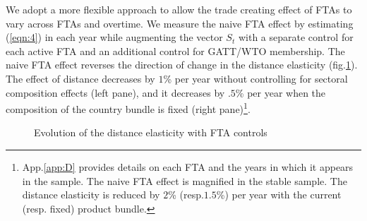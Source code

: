 \documentclass[12pt,twoside,a4paper,notitlepage]{article}
\begin{document}
We adopt a more flexible approach to allow the trade creating effect of FTAs to vary across FTAs and overtime. 
We measure the naive FTA effect by estimating (\ref{eqn:4}) in each year while augmenting the vector $S_t$ with a separate control for each active FTA and an additional control for GATT/WTO membership. The naive FTA effect reverses the direction of change in the distance elasticity (fig.\ref{fig:ftabench}). The effect of distance decreases by $1$\% per year without controlling for sectoral composition effects (left pane), and it decreases by $.5$\% per year when the composition of the country bundle is fixed (right pane)\footnote{App.\ref{app:D} provides details on each FTA and the years in which it appears in the sample. The naive FTA effect is magnified in the stable sample. The distance elasticity is reduced by $2$\% (resp.$1.5$\%) per year with the current (resp. fixed) product bundle.}.

\begin{figure}[h!]
\caption{Evolution of the distance elasticity with FTA controls \label{fig:ftabench}}
\begin{center}
\setlength{\fboxrule}{1pt} %
\setlength{\fboxsep}{.1in} %
\end{center}
\end{figure} 
\end{document}
